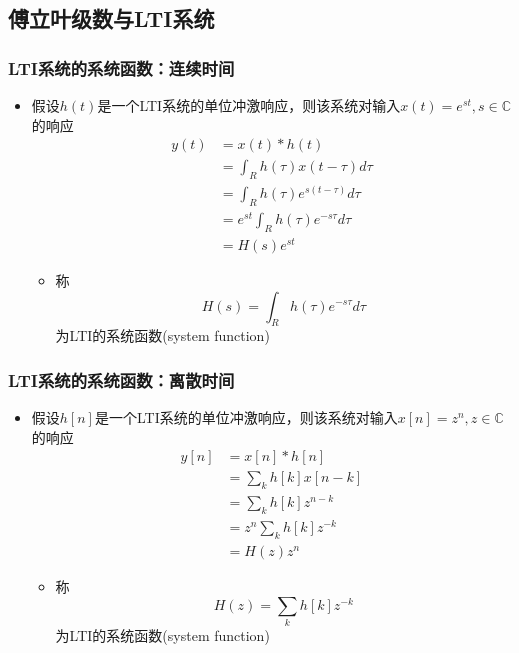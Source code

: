 \documentclass[CJKutf8,xcolor=pdftex,dvipsnames,table]{beamer}
\begin{document}
\begin{CJK*}{UTF8}{song}
  \section{傅立叶级数与LTI系统}
  
  \begin{frame}
    \frametitle{LTI系统的系统函数：连续时间}
    \begin{itemize}
    \item 假设$h(t)$是一个LTI系统的单位冲激响应，则该系统对输入$x(t)=e^{st}, s \in \mathbb{C}$的响应
    	\begin{align*}
 		y(t) & = x(t) * h(t) \\
		& = \int_R h(\tau)x(t - \tau )d\tau \\
		& = \int_R h(\tau )e^{s(t-\tau )}d\tau    \\
		& = e^{st} \int_R h(\tau)e^{-s\tau}d\tau \\
		& = H(s)e^{st}
    	\end{align*}   
		\begin{itemize}
		\item 称\[ H(s) = \int_R h(\tau)e^{-s\tau}d\tau \] 为LTI的系统函数(system function)
		\end{itemize}
    \end{itemize}
  \end{frame}  
     
  \begin{frame}
    \frametitle{LTI系统的系统函数：离散时间}
    \begin{itemize}
    \item 假设$h[n]$是一个LTI系统的单位冲激响应，则该系统对输入$x[n]=z^{n}, z \in \mathbb{C}$的响应
    	\begin{align*}
 		y[n] & = x[n] * h[n] \\
		& = \sum_k h[k]x[n-k] \\
		& = \sum_k h[k]z^{n-k}    \\
		& = z^{n} \sum_k h[k]z^{-k} \\
		& = H(z)z^{n}
    	\end{align*}   
		\begin{itemize}
		\item 称\[ H(z) = \sum_k h[k]z^{-k} \] 为LTI的系统函数(system function)
		\end{itemize}
    \end{itemize}
  \end{frame} 
          

\end{CJK*}
\end{document}

